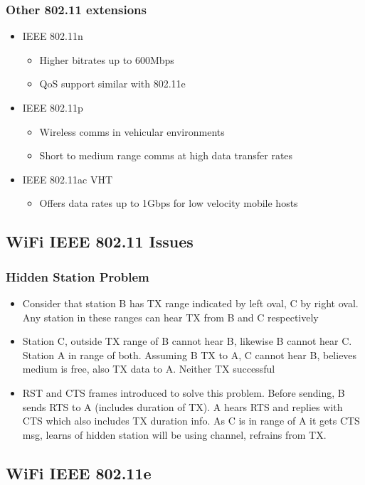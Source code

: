 \documentclass[a4paper]{article}
\begin{document}
\subsubsection{Other 802.11 extensions}
\begin{itemize}
	\item IEEE 802.11n
	\begin{itemize}
		\item Higher bitrates up to 600Mbps
		\item QoS support similar with 802.11e
	\end{itemize}
	\item IEEE 802.11p
	\begin{itemize}
		\item Wireless comms in vehicular environments
		\item Short to medium range comms at high data transfer rates
	\end{itemize}
	\item IEEE 802.11ac VHT
	\begin{itemize}
		\item Offers data rates up to 1Gbps for low velocity mobile
			hosts
	\end{itemize}
\end{itemize}
\subsection{WiFi IEEE 802.11 Issues}
\subsubsection{Hidden Station Problem}
\begin{itemize}
	\item Consider that station B has TX range indicated by left oval, C by
		right oval. Any station in these ranges can hear TX from B and C
		respectively
	\item Station C, outside TX range of B cannot hear B, likewise B cannot
		hear C. Station A in range of both. Assuming B TX to A, C cannot
		hear B, believes medium is free, also TX data to A. Neither TX
		successful
	\item RST and CTS frames introduced to solve this problem. Before
		sending, B sends RTS to A (includes duration of TX). A hears RTS
		and replies with CTS which also includes TX duration info. As C
		is in range of A it gets CTS msg, learns of hidden station will
		be using channel, refrains from TX.
\end{itemize}
\subsection{WiFi IEEE 802.11e}
\end{document}
